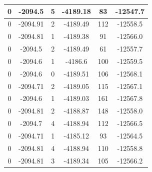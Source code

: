 \documentclass{article}
\begin{document}
\begin{tabular}{cccccc}
0&-2094.5&5&-4189.18&83&-12547.7 \\ \hline
0&-2094.91&2&-4189.49&112&-12558.5 \\ \hline
0&-2094.81&1&-4189.38&91&-12566.0 \\ \hline
0&-2094.5&2&-4189.49&61&-12557.7 \\ \hline
0&-2094.6&1&-4186.6&100&-12559.5 \\ \hline
0&-2094.6&0&-4189.51&106&-12568.1 \\ \hline
0&-2094.71&2&-4189.05&115&-12567.1 \\ \hline
0&-2094.6&1&-4189.03&161&-12567.8 \\ \hline
0&-2094.81&2&-4188.87&148&-12558.0 \\ \hline
0&-2094.7&4&-4188.94&112&-12566.5 \\ \hline
0&-2094.71&1&-4185.12&93&-12564.5 \\ \hline
0&-2094.81&4&-4188.94&110&-12558.8 \\ \hline
0&-2094.81&3&-4189.34&105&-12566.2 \\ \hline
\end{tabular}
\end{document}
